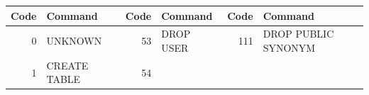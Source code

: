 \begin{appendix}
\begin{longtable}[]{@{}rl|rl|rl@{}}
\toprule
\begin{minipage}[b]{0.06\columnwidth}\raggedright\strut
Code\strut
\end{minipage} & \begin{minipage}[b]{0.19\columnwidth}\raggedright\strut
Command\strut
\end{minipage} & \begin{minipage}[b]{0.06\columnwidth}\raggedright\strut
Code\strut
\end{minipage} & \begin{minipage}[b]{0.24\columnwidth}\raggedright\strut
Command\strut
\end{minipage} & \begin{minipage}[b]{0.06\columnwidth}\raggedright\strut
Code\strut
\end{minipage} & \begin{minipage}[b]{0.24\columnwidth}\raggedright\strut
Command\strut
\end{minipage}\tabularnewline
\midrule
\endhead
\begin{minipage}[t]{0.06\columnwidth}\raggedright\strut
0\strut
\end{minipage} & \begin{minipage}[t]{0.19\columnwidth}\raggedright\strut
UNKNOWN\strut
\end{minipage} & \begin{minipage}[t]{0.06\columnwidth}\raggedright\strut
53\strut
\end{minipage} & \begin{minipage}[t]{0.24\columnwidth}\raggedright\strut
DROP USER\strut
\end{minipage} & \begin{minipage}[t]{0.06\columnwidth}\raggedright\strut
111\strut
\end{minipage} & \begin{minipage}[t]{0.24\columnwidth}\raggedright\strut
DROP PUBLIC SYNONYM\strut
\end{minipage}\tabularnewline
\begin{minipage}[t]{0.06\columnwidth}\raggedright\strut
1\strut
\end{minipage} & \begin{minipage}[t]{0.19\columnwidth}\raggedright\strut
CREATE TABLE\strut
\end{minipage} & \begin{minipage}[t]{0.06\columnwidth}\raggedright\strut
54\strut
\end{minipage} & \begin{minipage}[t]{0.24\columnwidth}\raggedright\strut

\end{minipage}
\end{longtable}
\end{appendix}
